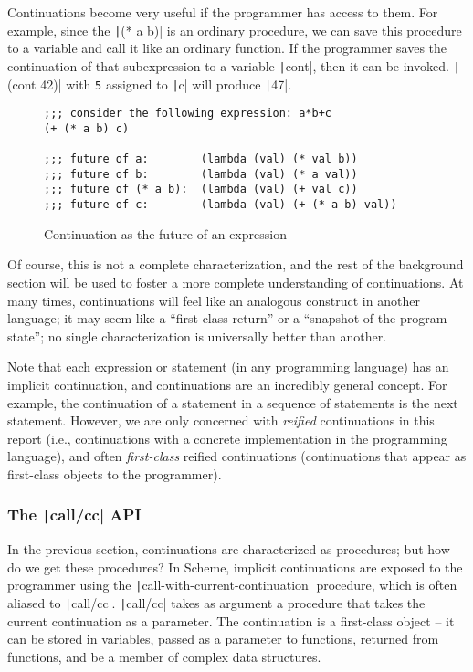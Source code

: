\documentclass[]{article}
\begin{document}
Continuations become very useful if the programmer has access to them. For example, since the \texttt|(* a b)| is an ordinary procedure, we can save this procedure to a variable and call it like an ordinary function. If the programmer saves the continuation of that subexpression to a variable \texttt|cont|, then it can be invoked. \texttt|(cont 42)| with \texttt{5} assigned to \texttt|c| will produce \texttt|47|.

\begin{figure}
  \centering
\begin{verbatim}
;;; consider the following expression: a*b+c
(+ (* a b) c)

;;; future of a:        (lambda (val) (* val b))
;;; future of b:        (lambda (val) (* a val))
;;; future of (* a b):  (lambda (val) (+ val c))
;;; future of c:        (lambda (val) (+ (* a b) val))
\end{verbatim}
  \caption{Continuation as the future of an expression}
  \label{fig:cexp}
\end{figure}

Of course, this is not a complete characterization, and the rest of the background section will be used to foster a more complete understanding of continuations. At many times, continuations will feel like an analogous construct in another language; it may seem like a ``first-class return'' or a ``snapshot of the program state''; no single characterization is universally better than another.

Note that each expression or statement (in any programming language) has an implicit continuation, and continuations are an incredibly general concept. For example, the continuation of a statement in a sequence of statements is the next statement. However, we are only concerned with \textit{reified} continuations in this report (i.e., continuations with a concrete implementation in the programming language), and often \textit{first-class} reified continuations (continuations that appear as first-class objects to the programmer).

\subsubsection{The \texttt|call/cc| API}
\label{sec:cacc}

In the previous section, continuations are characterized as procedures; but how do we get these procedures? In Scheme, implicit continuations are exposed to the programmer using the \texttt|call-with-current-continuation| procedure, which is often aliased to \texttt|call/cc|. \texttt|call/cc| takes as argument a procedure that takes the current continuation as a parameter. The continuation is a first-class object -- it can be stored in variables, passed as a parameter to functions, returned from functions, and be a member of complex data structures.
\end{document}
